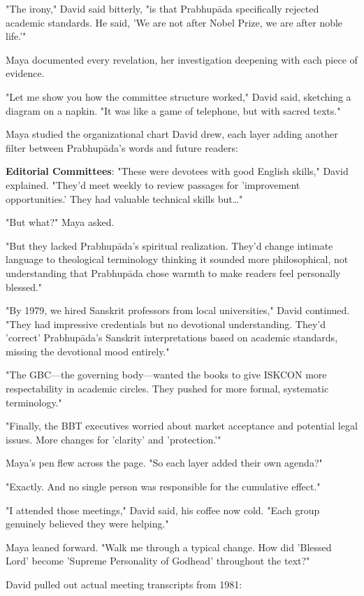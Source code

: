 \documentclass[12pt,twoside]{book}
\begin{document}
"The irony," David said bitterly, "is that Prabhupāda specifically rejected academic standards. He said, 'We are not after Nobel Prize, we are after noble life.'"

Maya documented every revelation, her investigation deepening with each piece of evidence.


"Let me show you how the committee structure worked," David said, sketching a diagram on a napkin. "It was like a game of telephone, but with sacred texts."

Maya studied the organizational chart David drew, each layer adding another filter between Prabhupāda's words and future readers:

\textbf{\textbf{Editorial Committees}}: "These were devotees with good English skills," David explained. "They'd meet weekly to review passages for 'improvement opportunities.' They had valuable technical skills but\ldots{}"

"But what?" Maya asked.

"But they lacked Prabhupāda's spiritual realization. They'd change intimate language to theological terminology thinking it sounded more philosophical, not understanding that Prabhupāda chose warmth to make readers feel personally blessed."

"By 1979, we hired Sanskrit professors from local universities," David continued. "They had impressive credentials but no devotional understanding. They'd 'correct' Prabhupāda's Sanskrit interpretations based on academic standards, missing the devotional mood entirely."

"The GBC—the governing body—wanted the books to give ISKCON more respectability in academic circles. They pushed for more formal, systematic terminology."

"Finally, the BBT executives worried about market acceptance and potential legal issues. More changes for 'clarity' and 'protection.'"

Maya's pen flew across the page. "So each layer added their own agenda?"

"Exactly. And no single person was responsible for the cumulative effect."


"I attended those meetings," David said, his coffee now cold. "Each group genuinely believed they were helping."

Maya leaned forward. "Walk me through a typical change. How did 'Blessed Lord' become 'Supreme Personality of Godhead' throughout the text?"

David pulled out actual meeting transcripts from 1981:
\end{document}
